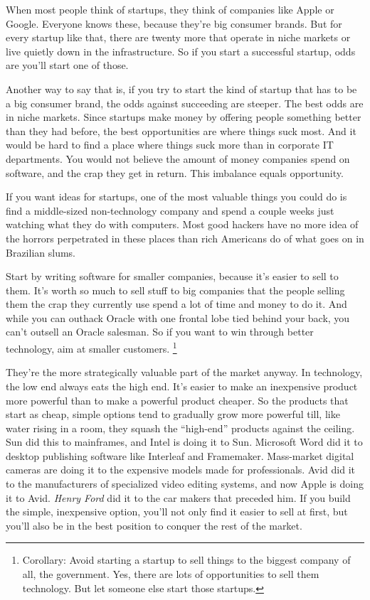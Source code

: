 \documentclass[12pt]{book}
\begin{document}
When most people think of startups, they think of companies like Apple
or Google. Everyone knows these, because they're big consumer brands.
But for every startup like that, there are twenty more that operate in
niche markets or live quietly down in the infrastructure. So if you
start a successful startup, odds are you'll start one of those.

Another way to say that is, if you try to start the kind of startup that
has to be a big consumer brand, the odds against succeeding are steeper.
The best odds are in niche markets. Since startups make money by
offering people something better than they had before, the best
opportunities are where things suck most. And it would be hard to find a
place where things suck more than in corporate IT departments. You would
not believe the amount of money companies spend on software, and the
crap they get in return. This imbalance equals opportunity.

If you want ideas for startups, one of the most valuable things you
could do is find a middle-sized non-technology company and spend a
couple weeks just watching what they do with computers. Most good
hackers have no more idea of the horrors perpetrated in these places
than rich Americans do of what goes on in Brazilian slums.

Start by writing software for smaller companies, because it's easier to
sell to them. It's worth so much to sell stuff to big companies that the
people selling them the crap they currently use spend a lot of time and
money to do it. And while you can outhack Oracle with one frontal lobe
tied behind your back, you can't outsell an Oracle salesman. So if you
want to win through better technology, aim at smaller customers. \footnote{Corollary: Avoid starting a startup to sell things to the
biggest company of all, the government. Yes, there are lots of
opportunities to sell them technology. But let someone else start those
startups.}

They're the more strategically valuable part of the market anyway. In
technology, the low end always eats the high end. It's easier to make an
inexpensive product more powerful than to make a powerful product
cheaper. So the products that start as cheap, simple options tend to
gradually grow more powerful till, like water rising in a room, they
squash the ``high-end'' products against the ceiling. Sun did this to
mainframes, and Intel is doing it to Sun. Microsoft Word did it to
desktop publishing software like Interleaf and Framemaker. Mass-market
digital cameras are doing it to the expensive models made for
professionals. Avid did it to the manufacturers of specialized video
editing systems, and now Apple is doing it to Avid. \emph{Henry Ford}
did it to the car makers that preceded him. If you build the simple,
inexpensive option, you'll not only find it easier to sell at first, but
you'll also be in the best position to conquer the rest of the market.
\end{document}
